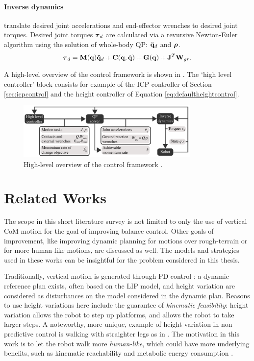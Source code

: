 \paragraph{Inverse dynamics} translate desired joint accelerations and end-effector wrenches to desired joint torques. Desired joint torques $\boldsymbol{\tau}_d$ are calculated via a revursive Newton-Euler algorithm using the solution of whole-body \ac{QP}: $\ddot{\mathbf{q}}_d$ and $\boldsymbol{\rho}$.
\begin{equation}
    \boldsymbol{\tau}_d = \mathbf{M}(\mathbf{q})\ddot{\mathbf{q}}_d + \mathbf{C}(\mathbf{q},\dot{\mathbf{q}}) + \mathbf{G}(\mathbf{q}) + \mathbf{J}^T \mathbf{W}_{gr}.
\end{equation}

A high-level overview of the control framework is shown in . The `high level controller' block consists for example of the \ac{ICP} controller of Section \ref{sec:icpcontrol} and the height controller of Equation \ref{eq:defaultheightcontrol}.
\begin{figure}[h]
\centering
\includegraphics[width=0.8\textwidth]{STYLESTUFF/controlframework.png}
\caption{High-level overview of the control framework \cite{koolen2016design}. }
\label{fig:framework}
\end{figure}

\section{Related Works}\label{sec:relatedworksheight}
The scope in this short literature survey is not limited to only the use of vertical \ac{CoM} motion for the goal of improving balance control. Other goals of improvement, like improving dynamic planning for motions over rough-terrain or for more human-like motions, are discussed as well. The models and strategies used in these works can be insightful for the problem considered in this thesis.

Traditionally, vertical motion is generated through PD-control \cite{kajita2003resolved, koolen2016design}: a dynamic reference plan exists, often based on the LIP model, and height variation are considered as disturbances on the model considered in the dynamic plan. Reasons to use height variations here include the guarantee of \textit{kinematic feasibility}: height variation allows the robot to step up platforms, and allows the robot to take larger steps. A noteworthy, more unique, example of height variation in non-predictive control is walking with straighter legs as in \cite{griffin2018straight}. The motivation in this work is to let the robot walk more \textit{human-like}, which could have more underlying benefits, such as kinematic reachability and metabolic energy consumption \cite{wang2012optimizing}.

